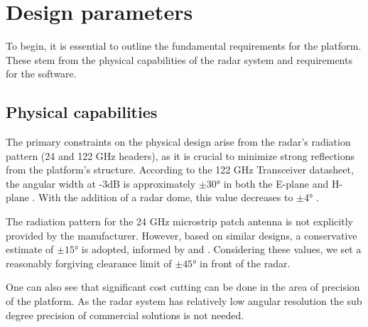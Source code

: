 \def\PageLayout{single-no-print}
\def\DocLanguage{en}
\def\PackagesIncludeTikz{yes}
\def\PackagesIncludeBib{yes}








\newcommand{\sidar}{SiRad Easy\textsuperscript{\copyright}}







\tableofcontents

\newpage
{}
\setcounter{page}{1}


\pagestyle{fancy}


\chapter{Design parameters}

To begin, it is essential to outline the fundamental requirements for the platform.
These stem from the physical capabilities of the radar system and requirements for the software.

\section{Physical capabilities}

The primary constraints on the physical design arise from the radar's radiation pattern (24 and 122 GHz headers), as it is crucial to minimize strong reflections from the platform's structure. According to the 122 GHz Transceiver datasheet, the angular width at -3dB is approximately $\pm30\text{°}$ in both the E-plane and H-plane \cite{sidarTRX}. With the addition of a radar dome, this value decreases to $\pm4\text{°}$ \cite{sidarMAN}.

The radiation pattern for the 24 GHz microstrip patch antenna is not explicitly provided by the manufacturer. However, based on similar designs, a conservative estimate of $\pm15\text{°}$ is adopted, informed by \cite{patch1} and \cite{patch2}. Considering these values, we set a reasonably forgiving clearance limit of $\pm45\text{°}$ in front of the radar.

One can also see that significant cost cutting can be done in the area of precision of the platform.
As the radar system has relatively low angular resolution the sub degree precision of commercial solutions is not needed.

